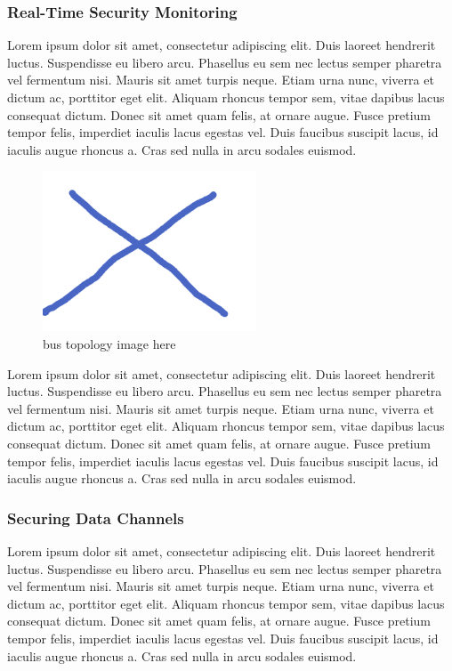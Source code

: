 \documentclass[final,conference,10pt]{IEEEtran}
\begin{document}
\subsubsection{Real-Time Security Monitoring}
Lorem ipsum dolor sit amet, consectetur adipiscing elit. Duis laoreet hendrerit luctus. Suspendisse eu libero arcu. Phasellus eu sem nec lectus semper pharetra vel fermentum nisi. Mauris sit amet turpis neque. Etiam urna nunc, viverra et dictum ac, porttitor eget elit. Aliquam rhoncus tempor sem, vitae dapibus lacus consequat dictum. Donec sit amet quam felis, at ornare augue. Fusce pretium tempor felis, imperdiet iaculis lacus egestas vel. Duis faucibus suscipit lacus, id iaculis augue rhoncus a. Cras sed nulla in arcu sodales euismod.

\begin{figure}[!t]
\centering
\includegraphics[width=2.5in]{topology}
\caption{bus topology image here}
\label{fig:monitor}
\end{figure}

Lorem ipsum dolor sit amet, consectetur adipiscing elit. Duis laoreet hendrerit luctus. Suspendisse eu libero arcu. Phasellus eu sem nec lectus semper pharetra vel fermentum nisi. Mauris sit amet turpis neque. Etiam urna nunc, viverra et dictum ac, porttitor eget elit. Aliquam rhoncus tempor sem, vitae dapibus lacus consequat dictum. Donec sit amet quam felis, at ornare augue. Fusce pretium tempor felis, imperdiet iaculis lacus egestas vel. Duis faucibus suscipit lacus, id iaculis augue rhoncus a. Cras sed nulla in arcu sodales euismod.

\subsubsection{Securing Data Channels}
Lorem ipsum dolor sit amet, consectetur adipiscing elit. Duis laoreet hendrerit luctus. Suspendisse eu libero arcu. Phasellus eu sem nec lectus semper pharetra vel fermentum nisi. Mauris sit amet turpis neque. Etiam urna nunc, viverra et dictum ac, porttitor eget elit. Aliquam rhoncus tempor sem, vitae dapibus lacus consequat dictum. Donec sit amet quam felis, at ornare augue. Fusce pretium tempor felis, imperdiet iaculis lacus egestas vel. Duis faucibus suscipit lacus, id iaculis augue rhoncus a. Cras sed nulla in arcu sodales euismod.
\end{document}
